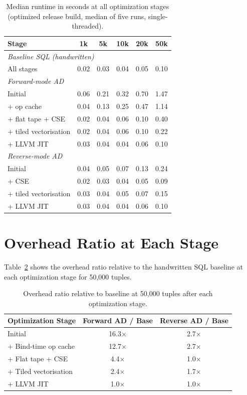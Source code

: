 \documentclass[12pt]{report}
\begin{document}
\begin{table}[H]
\centering
\small
\begin{tabular}{|l|c|c|c|c|c|}
\hline
Stage & 1k & 5k & 10k & 20k & 50k \\
\hline
\multicolumn{6}{|l|}{\textit{Baseline SQL (handwritten)}} \\
All stages & 0.02 & 0.03 & 0.04 & 0.05 & 0.10 \\
\hline
\multicolumn{6}{|l|}{\textit{Forward-mode AD}} \\
Initial & 0.06 & 0.21 & 0.32 & 0.70 & 1.47 \\
+ op cache & 0.04 & 0.13 & 0.25 & 0.47 & 1.14 \\
+ flat tape + CSE & 0.02 & 0.04 & 0.06 & 0.10 & 0.40 \\
+ tiled vectorisation & 0.02 & 0.04 & 0.06 & 0.10 & 0.22 \\
+ LLVM JIT & 0.03 & 0.04 & 0.04 & 0.06 & 0.10 \\
\hline
\multicolumn{6}{|l|}{\textit{Reverse-mode AD}} \\
Initial & 0.04 & 0.05 & 0.07 & 0.13 & 0.24 \\
+ CSE & 0.02 & 0.03 & 0.04 & 0.05 & 0.09 \\
+ tiled vectorisation & 0.03 & 0.04 & 0.05 & 0.07 & 0.15 \\
+ LLVM JIT & 0.03 & 0.04 & 0.04 & 0.06 & 0.10 \\
\hline
\end{tabular}
\caption{Median runtime in seconds at all optimization stages
(optimized release build, median of five runs, single-threaded).}
\label{tab:extended_all_stages}
\end{table}

\section{Overhead Ratio at Each Stage}

Table~\ref{tab:overhead_ratios} shows the overhead ratio relative to
the handwritten SQL baseline at each optimization stage for 50{,}000 tuples.

\begin{table}[H]
\centering
\begin{tabular}{|l|c|c|}
\hline
Optimization Stage & Forward AD / Base & Reverse AD / Base \\
\hline
Initial & 16.3$\times$ & 2.7$\times$ \\
+ Bind-time op cache & 12.7$\times$ & 2.7$\times$ \\
+ Flat tape + CSE & 4.4$\times$ & 1.0$\times$ \\
+ Tiled vectorisation & 2.4$\times$ & 1.7$\times$ \\
+ LLVM JIT & 1.0$\times$ & 1.0$\times$ \\
\hline
\end{tabular}
\caption{Overhead ratio relative to baseline at 50{,}000 tuples after
each optimization stage.}
\label{tab:overhead_ratios}
\end{table}
\end{document}
